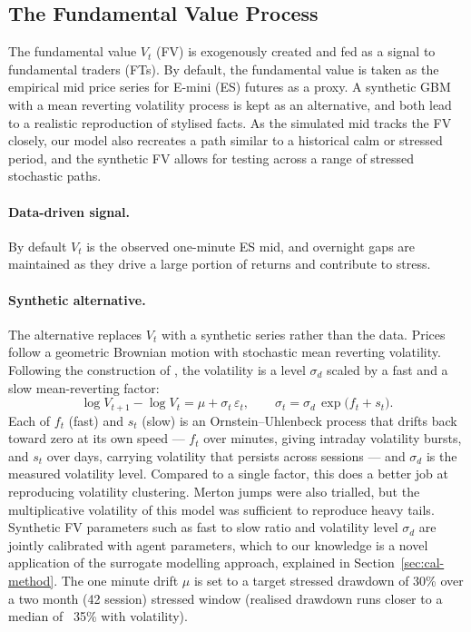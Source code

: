 \subsection{The Fundamental Value Process}
\label{sec:fundamental}

The fundamental value $V_t$ (FV) is exogenously created and fed as a signal to fundamental traders (FTs). By default, the fundamental value is taken as the empirical mid price series for E-mini (ES) futures as a proxy. A synthetic GBM with a mean reverting volatility process is kept as an alternative, and both lead to a realistic reproduction of stylised facts. As the simulated mid tracks the FV closely, our model also recreates a path similar to a historical calm or stressed period, and the synthetic FV allows for testing across a range of stressed stochastic paths. 


\paragraph{Data-driven signal.}
By default $V_t$ is the observed one-minute ES mid, and overnight gaps are maintained as they drive a large portion of returns and contribute to stress.

\paragraph{Synthetic alternative.}

The alternative replaces $V_t$ with a synthetic series rather than the data. Prices follow a geometric
Brownian motion with stochastic mean reverting volatility. Following the construction of \citet{barndorff_shephard_2001}, the volatility is a level $\sigma_d$ scaled by a
fast and a slow mean-reverting factor:
\begin{equation}
  \log V_{t+1} - \log V_t = \mu + \sigma_t\,\varepsilon_t,
  \qquad
  \sigma_t = \sigma_d\,\exp\!\big(f_t + s_t\big) .
\end{equation}
Each of $f_t$ (fast) and $s_t$ (slow) is an Ornstein--Uhlenbeck process that drifts back toward zero
at its own speed --- $f_t$ over minutes, giving intraday volatility bursts, and $s_t$ over days,
carrying volatility that persists across sessions --- and $\sigma_d$ is the measured volatility level. Compared to a single factor, this does a better job at reproducing volatility clustering. Merton jumps were also trialled, but the multiplicative volatility of this model was sufficient to reproduce heavy tails. Synthetic FV parameters such as fast to slow ratio and volatility level $\sigma_d$ are jointly calibrated with agent parameters, which to our knowledge is a novel application of the surrogate modelling approach, explained in Section~\ref{sec:cal-method}. The one minute drift $\mu$ is set to a target stressed drawdown of 30\% over a two month (42 session) stressed window (realised drawdown runs closer to a median of ~35\% with volatility). 


